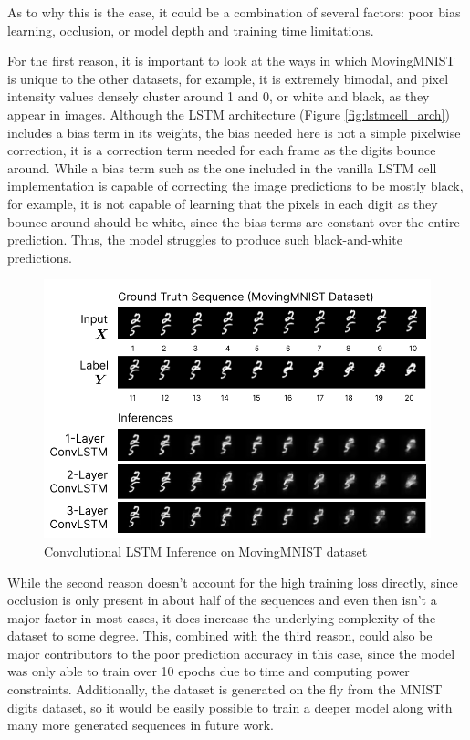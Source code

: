 \documentclass{scrartcl}
\begin{document}
As to why this is the case, it could be a combination of several factors: poor
bias learning, occlusion, or model depth and training time limitations. 

For the first reason, it is important to look at the ways in which MovingMNIST
is unique to the other datasets, for example, it is extremely bimodal, and
pixel intensity values densely cluster around 1 and 0, or white and black, as
they appear in images. Although the LSTM architecture (Figure \ref{fig:lstmcell_arch})
includes a bias term in its weights, the bias needed here is not a simple
pixelwise correction, it is a correction term needed for each frame as the
digits bounce around. While a bias term such as the one included in the vanilla
LSTM cell implementation is capable of correcting the image predictions to be
mostly black, for example, it is not capable of learning that the pixels in
each digit as they bounce around should be white, since the bias terms are
constant over the entire prediction. Thus, the model struggles to produce such
black-and-white predictions.

\begin{figure}[H]
	\begin{center}
		\includegraphics[width=1\textwidth]{inferences/mmnist/mmnist_inferences_1.png}
	\end{center}
	\caption{Convolutional LSTM Inference on MovingMNIST dataset}
	\label{inf:convlstm_mmnist_inference_1}
\end{figure}

While the second reason doesn't account for the high training loss directly,
since occlusion is only present in about half of the sequences and even then
isn't a major factor in most cases, it does increase the underlying complexity
of the dataset to some degree. This, combined with the third reason, could also
be major contributors to the poor prediction accuracy in this case, since the
model was only able to train over 10 epochs due to time and computing power
constraints. Additionally, the dataset is generated on the fly from the MNIST
digits dataset, so it would be easily possible to train a deeper model along
with many more generated sequences in future work.
\end{document}
